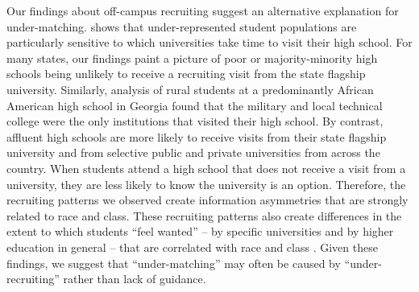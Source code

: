 \documentclass[twoside]{article}
\begin{document}
Our findings about off-campus recruiting suggest an alternative explanation for under-matching. \cite{RN4324} shows that under-represented student populations are particularly sensitive to which universities take time to visit their high school.  For many states, our findings paint a picture of poor or majority-minority high schools being unlikely to receive a recruiting visit from the state flagship university. Similarly, \cite{RN4420} analysis of rural students at a predominantly African American high school in Georgia found that the military and local technical college were the only institutions that visited their high school. By contrast, affluent high schools are more likely to receive visits from their state flagship university and from selective public and private universities from across the country.  When students attend a high school that does not receive a visit from a university, they are less likely to know the university is an option.  Therefore, the recruiting patterns we observed create information asymmetries that are strongly related to race and class.  These recruiting patterns also create differences in the extent to which students ``feel wanted'' -- by specific universities and by higher education in general -- that are correlated with race and class \citep{RN4324}.  Given these findings, we suggest that ``under-matching'' may often be caused by ``under-recruiting'' rather than lack of guidance.
\end{document}
